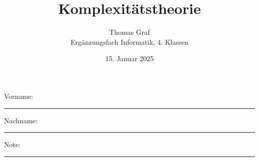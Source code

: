 
\newtoggle{withbonus} \toggletrue{withbonus} %

\newcommand{\mycourse}{Ergänzungsfach Informatik}
\newcommand{\myclass}{4. Klassen}
\newcommand{\mydate}{15. Januar 2025}

\title{\textbf{Komplexitätstheorie}}
\author{Thomas Graf\\
	\mycourse, \myclass}
\date{\mydate}
\maketitle
\thispagestyle{headandfoot}

\begin{center}
\end{center}
\vspace{10mm}

\begin{center}
	Vorname: \rule{45mm}{0.8pt}\qquad Nachname: \rule{45mm}{0.8pt}
\end{center}
\vspace{20mm}

\begin{center}
	\iftoggle{withbonus} {
		\combinedgradetable[h][questions]
	} {
		\gradetable[h][questions]
	}
\end{center}
\vspace{15mm}
\begin{center}
	Note:
	\vspace{10mm}

	\rule{8mm}{1.2pt}
\end{center}
\clearpage



